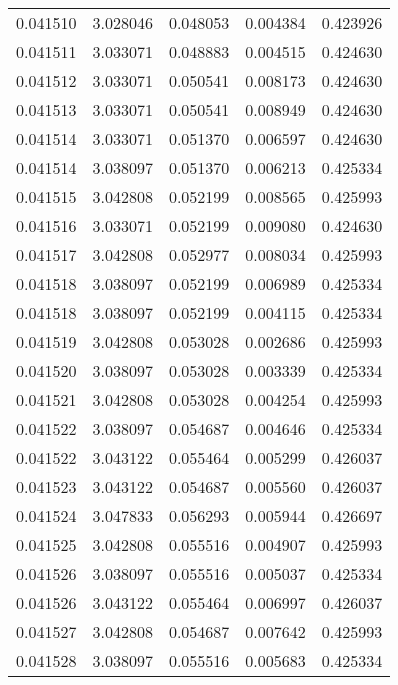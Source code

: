 \begin{tabular}{lrrrr}
0.041510    &  3.028046 &  0.048053 &  0.004384 &             0.423926 \\
0.041511    &  3.033071 &  0.048883 &  0.004515 &             0.424630 \\
0.041512    &  3.033071 &  0.050541 &  0.008173 &             0.424630 \\
0.041513    &  3.033071 &  0.050541 &  0.008949 &             0.424630 \\
0.041514    &  3.033071 &  0.051370 &  0.006597 &             0.424630 \\
0.041514    &  3.038097 &  0.051370 &  0.006213 &             0.425334 \\
0.041515    &  3.042808 &  0.052199 &  0.008565 &             0.425993 \\
0.041516    &  3.033071 &  0.052199 &  0.009080 &             0.424630 \\
0.041517    &  3.042808 &  0.052977 &  0.008034 &             0.425993 \\
0.041518    &  3.038097 &  0.052199 &  0.006989 &             0.425334 \\
0.041518    &  3.038097 &  0.052199 &  0.004115 &             0.425334 \\
0.041519    &  3.042808 &  0.053028 &  0.002686 &             0.425993 \\
0.041520    &  3.038097 &  0.053028 &  0.003339 &             0.425334 \\
0.041521    &  3.042808 &  0.053028 &  0.004254 &             0.425993 \\
0.041522    &  3.038097 &  0.054687 &  0.004646 &             0.425334 \\
0.041522    &  3.043122 &  0.055464 &  0.005299 &             0.426037 \\
0.041523    &  3.043122 &  0.054687 &  0.005560 &             0.426037 \\
0.041524    &  3.047833 &  0.056293 &  0.005944 &             0.426697 \\
0.041525    &  3.042808 &  0.055516 &  0.004907 &             0.425993 \\
0.041526    &  3.038097 &  0.055516 &  0.005037 &             0.425334 \\
0.041526    &  3.043122 &  0.055464 &  0.006997 &             0.426037 \\
0.041527    &  3.042808 &  0.054687 &  0.007642 &             0.425993 \\
0.041528    &  3.038097 &  0.055516 &  0.005683 &             0.425334 \\

\end{tabular}
